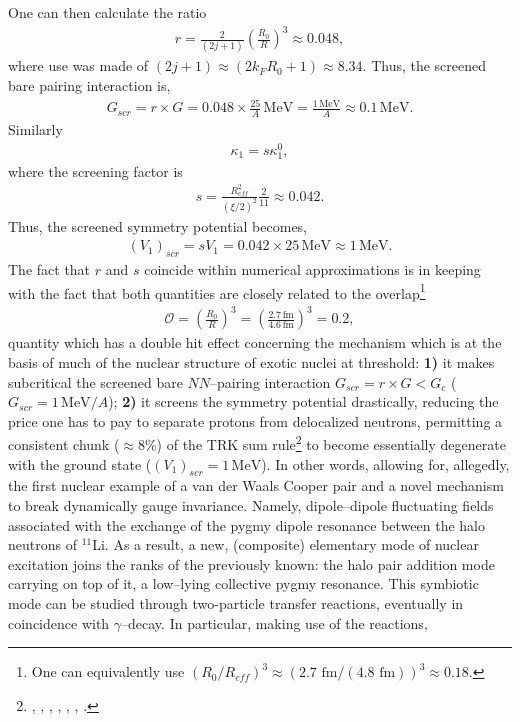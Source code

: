   One can then calculate the ratio
    \begin{align}
r=\frac{2}{(2j+1)}\left(\frac{R_0}{R}\right)^3\approx 0.048,
   \end{align}
 where use was made of $(2j+1)\approx (2k_FR_0+1)\approx 8.34$. Thus, the screened bare pairing interaction is,
\begin{align}
G_{scr}=r\times G=0.048\times\frac{25}{A}\, \text{MeV}=\frac{1\,\text{MeV}}{A}\approx 0.1\,\text{MeV}.
\end{align}
 Similarly
 \begin{align}
\kappa_1=s\kappa_1^0,
 \end{align}
 where the screening factor is 
  \begin{align}
s=\frac{R_{eff}^2}{\left(\xi/2\right)^2}\frac{2}{11}\approx 0.042.
  \end{align}
Thus, the screened symmetry potential becomes,
  \begin{align}
(V_1)_{scr}=sV_1=0.042\times 25\, \text{MeV}\approx1\,\text{MeV}.
  \end{align}
The fact that $r$ and $s$ coincide within numerical approximations is in keeping with the fact that both quantities are closely related to the overlap\footnote{One can equivalently use $\left(R_0/R_{eff}\right)^3\approx\left( 2.7\text{ fm}/(4.8\text{ fm})\right)^3\approx0.18$.}
  \begin{align}
\mathcal{O}=\left(\frac{R_0}{R}\right)^3=\left(\frac{2.7\,\text{fm}}{4.6\,\text{fm}}\right)^3=0.2,
  \end{align}
quantity which has a double hit effect concerning the mechanism which is at the basis of much of the nuclear structure of exotic nuclei at threshold: \textbf{1)} it makes subcritical the screened bare $NN$--pairing interaction $G_{scr}=r\times G<G_c$ ($G_{scr}=1\,\text{MeV}/A$); \textbf{2)} it screens the symmetry potential drastically, reducing the price one has to pay to separate protons from delocalized neutrons, permitting a consistent chunk ($\approx 8$\%) of the TRK sum rule\footnote{\cite{Zinser:97}, \cite{Nakamura:06}, \cite{Shimoura:95}, \cite{Ieki:93}, \cite{Sackett:93}, \cite{Kanungo:15}, \cite{Kobayashi:89}.} to  become essentially degenerate with the  ground state ($(V_1)_{scr}=1 \,\text{MeV}$). In other words,  allowing for, allegedly, the first nuclear example of a van der Waals Cooper pair and a novel mechanism to break dynamically gauge invariance. Namely, dipole--dipole fluctuating fields associated with the exchange of the pygmy dipole resonance between the halo neutrons of $^{11}$Li. As a result, a new, (composite) elementary mode of nuclear excitation joins the ranks of the previously known: the halo pair addition mode carrying on top of it, a low--lying collective pygmy resonance. This symbiotic mode can be studied through two-particle transfer reactions, eventually in coincidence with $\gamma$--decay. In particular, making use of the reactions,\vspace{0.2cm}
